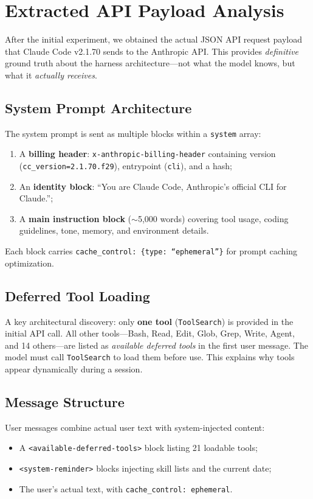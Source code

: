 \documentclass[10pt,twocolumn]{article}
\begin{document}
\section{Extracted API Payload Analysis}
\label{sec:api_payload}

After the initial experiment, we obtained the actual JSON API request payload that Claude Code v2.1.70 sends to the Anthropic API.
This provides \textit{definitive} ground truth about the harness architecture---not what the model knows, but what it \textit{actually receives}.

\subsection{System Prompt Architecture}
The system prompt is sent as multiple blocks within a \texttt{system} array:
\begin{enumerate}
  \item A \textbf{billing header}: \texttt{x-anthropic-billing-header} containing version (\texttt{cc\_version=2.1.70.f29}), entrypoint (\texttt{cli}), and a hash;
  \item An \textbf{identity block}: ``You are Claude Code, Anthropic's official CLI for Claude.'';
  \item A \textbf{main instruction block} (${\sim}$5,000 words) covering tool usage, coding guidelines, tone, memory, and environment details.
\end{enumerate}
Each block carries \texttt{cache\_control: \{type: ``ephemeral''\}} for prompt caching optimization.

\subsection{Deferred Tool Loading}
A key architectural discovery: only \textbf{one tool} (\texttt{ToolSearch}) is provided in the initial API call.
All other tools---Bash, Read, Edit, Glob, Grep, Write, Agent, and 14 others---are listed as \textit{available deferred tools} in the first user message.
The model must call \texttt{ToolSearch} to load them before use.
This explains why tools appear dynamically during a session.

\subsection{Message Structure}
User messages combine actual user text with system-injected content:
\begin{itemize}
  \item A \texttt{<available-deferred-tools>} block listing 21 loadable tools;
  \item \texttt{<system-reminder>} blocks injecting skill lists and the current date;
  \item The user's actual text, with \texttt{cache\_control: ephemeral}.
\end{itemize}
\end{document}
